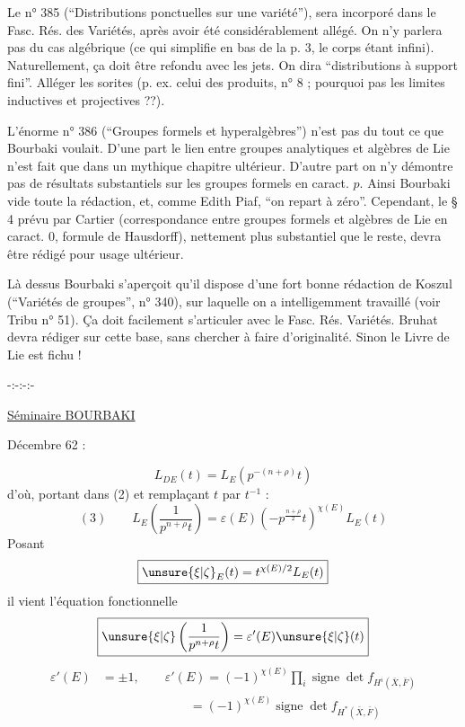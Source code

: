 Le n° 385 (``Distributions ponctuelles sur une variété''), sera incorporé dans le Fasc. Rés. des Variétés, après avoir été considérablement allégé. On n'y parlera pas du cas algébrique (ce qui simplifie en bas de la p. 3, le corps étant infini). Naturellement, ça doit être refondu avec les jets. On dira ``distributions à support fini''. Alléger les sorites (p. ex. celui des produits, n° 8 ; pourquoi pas les limites inductives et projectives ??).

L'énorme n° 386 (``Groupes formels et hyperalgèbres'') n'est pas du tout ce que Bourbaki voulait. D'une part le lien entre groupes analytiques et algèbres de Lie n'est fait que dans un mythique chapitre ultérieur. D'autre part on n'y démontre pas de résultats substantiels sur les groupes formels en caract. $p$. Ainsi Bourbaki vide toute la rédaction, et, comme Edith Piaf, ``on repart à zéro''. Cependant, le § 4 prévu par Cartier (correspondance entre groupes formels et algèbres de Lie en caract. 0, formule de Hausdorff), nettement plus substantiel que le reste, devra être rédigé pour usage ultérieur.

Là dessus Bourbaki s'aperçoit qu'il dispose d'une fort bonne rédaction de Koszul (``Variétés de groupes'', n° 340), sur laquelle on a intelligemment travaillé (voir Tribu n° 51). Ça doit facilement s'articuler avec le Fasc. Rés. Variétés. Bruhat devra rédiger sur cette base, sans chercher à faire d'originalité. Sinon le Livre de Lie est fichu !

\begin{center}-:-:-:-\end{center}
\begin{center}\uline{Séminaire BOURBAKI}\end{center}
Décembre 62 :

\[L_{DE}(t)=L_E\left(p^{-(n+\rho)}t\right)\]
d'où, portant dans (2) et remplaçant $t$ par $t^{-1}$ :
\[
(3)\qquad\boxed{L_E\left(\frac1{p^{n+\rho}t}\right)=\varepsilon(E)\left(-p^{\frac{n+\rho}{2}}t\right)^{\chi(E)}L_E(t)}
\]
Posant
\[\boxed{\unsure{\xi|\zeta}_E(t)=t^{\chi(E)/2}L_E(t)}\]
il vient l'équation fonctionnelle
\[\boxed{\unsure{\xi|\zeta}\left(\frac1{p^{n+\rho}t}\right)=\varepsilon'(E)\unsure{\xi|\zeta}(t)}\]
\[
\begin{aligned}
\varepsilon'(E)&=\pm1,\qquad\varepsilon'(E)=(-1)^{\chi(E)}\prod_i\operatorname{signe}\det f_{H^i(\bar X,\bar F)}\\
&\hspace{7em}=(-1)^{\chi(E)}\operatorname{signe}\det f_{H^*(\bar X,\bar F)}
\end{aligned}
\]


